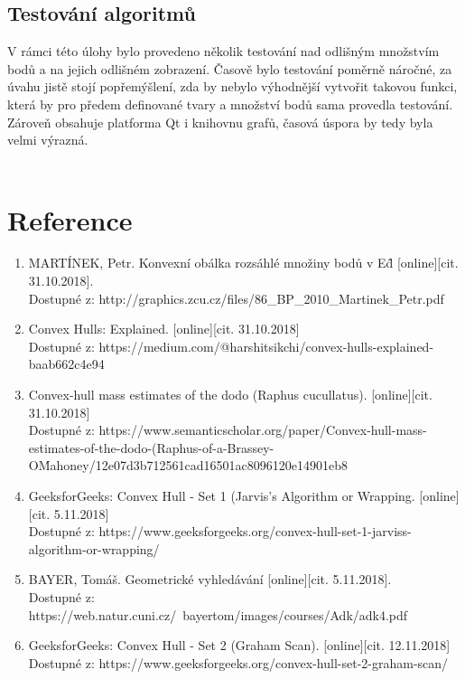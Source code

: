 \documentclass[a4paper, 12pt]{article}
\begin{document}
\subsection{Testování algoritmů}
V rámci této úlohy bylo provedeno několik testování nad odlišným množstvím bodů a na jejich odlišném zobrazení. Časově bylo testování poměrně náročné, za úvahu jistě stojí popřemýšlení, zda by nebylo výhodnější vytvořit takovou funkci, která by pro předem definované tvary a množství bodů sama provedla testování. Zároveň obsahuje platforma Qt i knihovnu grafů, časová úspora by tedy byla velmi výrazná.\\
\\




\clearpage
\section{Reference}

\begin{enumerate}
\item  MARTÍNEK, Petr. Konvexní obálka rozsáhlé množiny bodů v E\^d [online][cit. 31.10.2018]. \\
Dostupné z: http://graphics.zcu.cz/files/86\_BP\_2010\_Martinek\_Petr.pdf  \\

\item Convex Hulls: Explained. [online][cit. 31.10.2018]\\
Dostupné z: https://medium.com/@harshitsikchi/convex-hulls-explained-baab662c4e94\\

\item Convex-hull mass estimates of the dodo (Raphus cucullatus). [online][cit. 31.10.2018]\\
Dostupné z: https://www.semanticscholar.org/paper/Convex-hull-mass-estimates-of-the-dodo-(Raphus-of-a-Brassey-O\'Mahoney/12e07d3b712561cad16501ac8096120e14901eb8

\item GeeksforGeeks: Convex Hull - Set 1 (Jarvis's Algorithm or Wrapping. [online][cit. 5.11.2018]\\
Dostupné z: https://www.geeksforgeeks.org/convex-hull-set-1-jarviss-algorithm-or-wrapping/

\item  BAYER, Tomáš. Geometrické vyhledávání [online][cit. 5.11.2018]. \\
Dostupné z: https://web.natur.cuni.cz/~bayertom/images/courses/Adk/adk4.pdf  \\

\item GeeksforGeeks: Convex Hull - Set 2 (Graham Scan). [online][cit. 12.11.2018]\\
Dostupné z: https://www.geeksforgeeks.org/convex-hull-set-2-graham-scan/



\end{enumerate}
\end{document}
